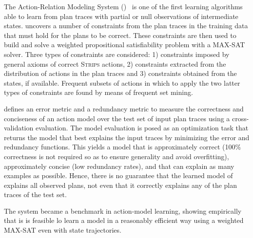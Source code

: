 \vspace{0.3cm}

The Action-Relation Modeling System (\textbf{\ARMS})~\cite{yang2007learning} is one of the first learning algorithms able to learn from plan traces with partial or null observations of intermediate states. \ARMS uncovers a number of constraints from the plan traces in the training data that must hold for the plans to be correct. These constraints are then used to build and solve a weighted propositional satisfiability problem with a MAX-SAT solver. Three types of constraints are considered: 1) constraints imposed by general axioms of correct \textsc{Strips} actions, 2) constraints extracted from the distribution of actions in the plan traces and 3) constraints obtained from the \PO states, if available. Frequent subsets of actions in which to apply the two latter types of constraints are found by means of frequent set mining.

\ARMS defines an error metric and a redundancy metric to measure the correctness and conciseness of an action model over the test set of input plan traces using a cross-validation evaluation. The model evaluation is posed as an optimization task that returns the model that best explains the input traces by minimizing the error and redundancy functions. This yields a model that is approximately correct (100\% correctness is not required so as to ensure generality and avoid overfitting), approximately concise (low redundancy rates), and that can explain as many examples as possible. Hence, there is no guarantee that the learned model of \ARMS explains all observed plans, not even that it correctly explains any of the plan traces of the test set.

The \ARMS system became a benchmark in action-model learning, showing empirically that is is feasible lo learn a model in a reasonably efficient way using a weighted MAX-SAT even with \NO state trajectories.


